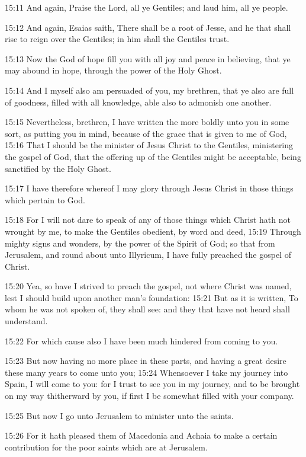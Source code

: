 15:11 And again, Praise the Lord, all ye Gentiles; and laud him, all ye people.

15:12 And again, Esaias saith, There shall be a root of Jesse, and he that shall rise to reign over the Gentiles; in him shall the Gentiles trust.

15:13 Now the God of hope fill you with all joy and peace in believing, that ye may abound in hope, through the power of the Holy Ghost.

15:14 And I myself also am persuaded of you, my brethren, that ye also are full of goodness, filled with all knowledge, able also to admonish one another.

15:15 Nevertheless, brethren, I have written the more boldly unto you in some sort, as putting you in mind, because of the grace that is given to me of God, 15:16 That I should be the minister of Jesus Christ to the Gentiles, ministering the gospel of God, that the offering up of the Gentiles might be acceptable, being sanctified by the Holy Ghost.

15:17 I have therefore whereof I may glory through Jesus Christ in those things which pertain to God.

15:18 For I will not dare to speak of any of those things which Christ hath not wrought by me, to make the Gentiles obedient, by word and deed, 15:19 Through mighty signs and wonders, by the power of the Spirit of God; so that from Jerusalem, and round about unto Illyricum, I have fully preached the gospel of Christ.

15:20 Yea, so have I strived to preach the gospel, not where Christ was named, lest I should build upon another man's foundation: 15:21 But as it is written, To whom he was not spoken of, they shall see: and they that have not heard shall understand.

15:22 For which cause also I have been much hindered from coming to you.

15:23 But now having no more place in these parts, and having a great desire these many years to come unto you; 15:24 Whensoever I take my journey into Spain, I will come to you: for I trust to see you in my journey, and to be brought on my way thitherward by you, if first I be somewhat filled with your company.

15:25 But now I go unto Jerusalem to minister unto the saints.

15:26 For it hath pleased them of Macedonia and Achaia to make a certain contribution for the poor saints which are at Jerusalem.

